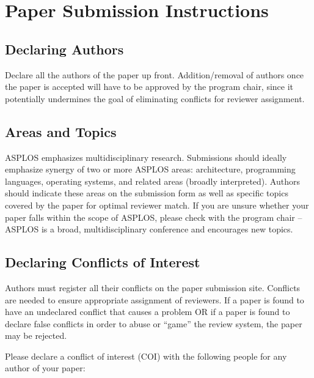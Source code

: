 \documentclass[pageno]{jpaper}
\begin{document}
\section{Paper Submission Instructions}

\subsection{Declaring Authors}

Declare all the authors of the paper up front. Addition/removal of authors
once the paper is accepted will have to be approved by the program chair,
since it potentially undermines the goal of eliminating conflicts for
reviewer assignment.

\subsection{Areas and Topics}

ASPLOS emphasizes multidisciplinary research. Submissions should ideally
emphasize synergy of two or more ASPLOS areas: architecture, programming
languages, operating systems, and related areas (broadly
interpreted). Authors should indicate these areas on the submission form as
well as specific topics covered by the paper for optimal reviewer match. If
you are unsure whether your paper falls within the scope of ASPLOS, please
check with the program chair -- ASPLOS is a broad, multidisciplinary
conference and encourages new topics.

\subsection{Declaring Conflicts of Interest}

Authors must register all their conflicts on the paper submission site.
Conflicts are needed to ensure appropriate assignment of reviewers.
If a paper is found to have an undeclared conflict that causes
a problem OR if a paper is found to declare false conflicts in order to
abuse or ``game'' the review system, the paper may be rejected.

Please declare a conflict of interest (COI) with the following people
for any author of your paper:
\end{document}

